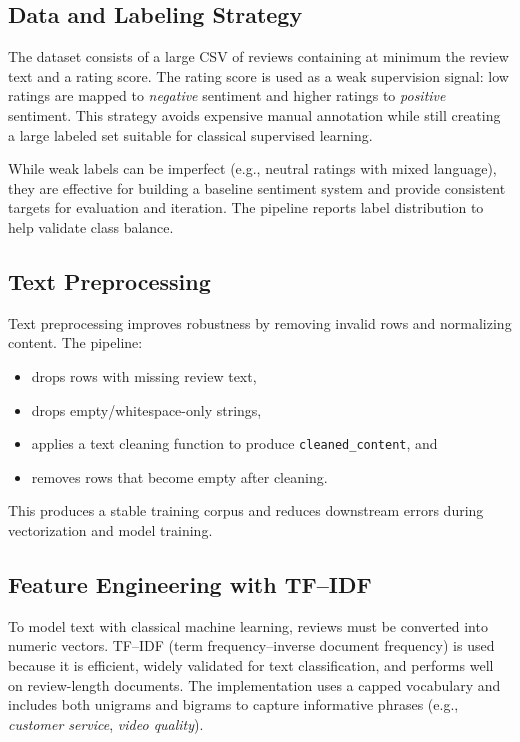 \documentclass[12pt]{article}
\begin{document}
\subsection{Data and Labeling Strategy}
The dataset consists of a large CSV of reviews containing at minimum the review text and a rating score. The rating score is used as a weak supervision signal: low ratings are mapped to \emph{negative} sentiment and higher ratings to \emph{positive} sentiment. This strategy avoids expensive manual annotation while still creating a large labeled set suitable for classical supervised learning.

While weak labels can be imperfect (e.g., neutral ratings with mixed language), they are effective for building a baseline sentiment system and provide consistent targets for evaluation and iteration. The pipeline reports label distribution to help validate class balance.

\subsection{Text Preprocessing}
Text preprocessing improves robustness by removing invalid rows and normalizing content. The pipeline:
\begin{itemize}
  \item drops rows with missing review text,
  \item drops empty/whitespace-only strings,
  \item applies a text cleaning function to produce \texttt{cleaned\_content}, and
  \item removes rows that become empty after cleaning.
\end{itemize}

This produces a stable training corpus and reduces downstream errors during vectorization and model training.

\subsection{Feature Engineering with TF--IDF}
To model text with classical machine learning, reviews must be converted into numeric vectors. TF--IDF (term frequency--inverse document frequency) is used because it is efficient, widely validated for text classification, and performs well on review-length documents. The implementation uses a capped vocabulary and includes both unigrams and bigrams to capture informative phrases (e.g., \emph{customer service}, \emph{video quality}).
\end{document}

